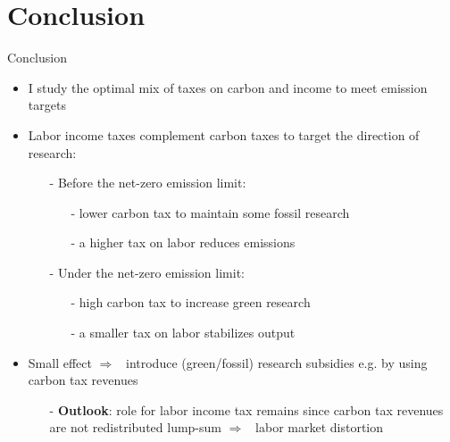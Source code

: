 \documentclass[11pt,aspectratio=169]{beamer}
\newcommand{\ar}{$\Rightarrow$ \ }
\begin{document}
	\section{Conclusion}
	\begin{frame}{Conclusion}
		\begin{itemize}[<+-| alert@+>]
			\item I study the optimal mix of taxes on carbon and income to meet emission targets
			\vspace{3mm}
			\item Labor income taxes complement carbon taxes to target the direction of research:
			\vspace{2mm}
			\begin{itemize}
				\item[-] Before the net-zero emission limit: 
				\begin{itemize}
					\item[-] lower carbon tax to maintain some fossil research
					\item[-] a higher tax on labor reduces emissions
				\end{itemize}
				\vspace{3mm}
				\item[-] Under the net-zero emission limit: 
				\begin{itemize}
					\item[-] high carbon tax to increase green research
					\item[-]  a smaller tax on labor stabilizes output
				\end{itemize}
			\end{itemize}
			\vspace{3mm}
			\item Small effect \ar introduce (green/fossil) research subsidies e.g. by using carbon tax revenues
			\vspace{2mm}
			
			\begin{itemize}
				\item[-] \textbf{Outlook}: role for labor income tax remains since carbon tax revenues are not redistributed lump-sum \ar labor market distortion
			\end{itemize}	
			
			
		\end{itemize}
	\end{frame}
		
\end{document}
